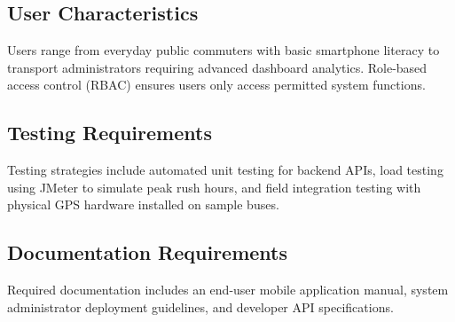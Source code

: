 \documentclass[11pt, a4paper]{article}
\begin{document}
\subsection{User Characteristics}
Users range from everyday public commuters with basic smartphone literacy to transport administrators requiring advanced dashboard analytics. Role-based access control (RBAC) ensures users only access permitted system functions.

\subsection{Testing Requirements}
Testing strategies include automated unit testing for backend APIs, load testing using JMeter to simulate peak rush hours, and field integration testing with physical GPS hardware installed on sample buses.

\subsection{Documentation Requirements}
Required documentation includes an end-user mobile application manual, system administrator deployment guidelines, and developer API specifications.
\end{document}
